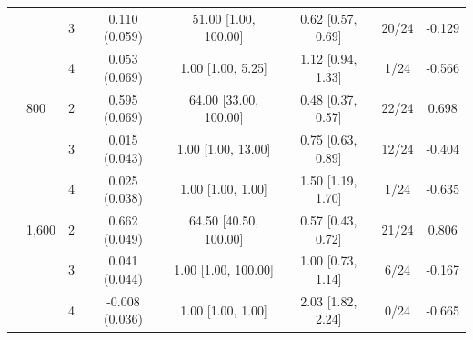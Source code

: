 \begin{tabular}{llcccccc}
 &  & 3 & 0.110 (0.059) & 51.00 [1.00, 100.00] & 0.62 [0.57, 0.69] & 20/24 & -0.129 \\
 &  & 4 & 0.053 (0.069) & 1.00 [1.00, 5.25] & 1.12 [0.94, 1.33] & 1/24 & -0.566 \\
 & 800 & 2 & 0.595 (0.069) & 64.00 [33.00, 100.00] & 0.48 [0.37, 0.57] & 22/24 & 0.698 \\
 &  & 3 & 0.015 (0.043) & 1.00 [1.00, 13.00] & 0.75 [0.63, 0.89] & 12/24 & -0.404 \\
 &  & 4 & 0.025 (0.038) & 1.00 [1.00, 1.00] & 1.50 [1.19, 1.70] & 1/24 & -0.635 \\
 & 1,600 & 2 & 0.662 (0.049) & 64.50 [40.50, 100.00] & 0.57 [0.43, 0.72] & 21/24 & 0.806 \\
 &  & 3 & 0.041 (0.044) & 1.00 [1.00, 100.00] & 1.00 [0.73, 1.14] & 6/24 & -0.167 \\
 &  & 4 & -0.008 (0.036) & 1.00 [1.00, 1.00] & 2.03 [1.82, 2.24] & 0/24 & -0.665 \\
\bottomrule
\end{tabular}
